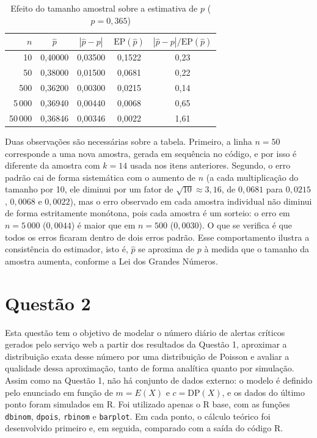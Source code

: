 \documentclass[10pt,a4paper]{article}
\begin{document}
\begin{table}[H]
\centering
\caption{Efeito do tamanho amostral sobre a estimativa de $p$ ($p = 0{,}365$)}
\label{tab:q1-tamanho}
\begin{tabular}{rcccc}
\hline
$n$ & $\hat{p}$ & $|\hat{p} - p|$ & $\text{EP}(\hat{p})$ & $|\hat{p} - p|/\text{EP}(\hat{p})$ \\
\hline
10     & 0,40000 & 0,03500 & 0,1522 & 0,23 \\
50     & 0,38000 & 0,01500 & 0,0681 & 0,22 \\
500    & 0,36200 & 0,00300 & 0,0215 & 0,14 \\
5\,000  & 0,36940 & 0,00440 & 0,0068 & 0,65 \\
50\,000 & 0,36846 & 0,00346 & 0,0022 & 1,61 \\
\hline
\end{tabular}
\end{table}

Duas observações são necessárias sobre a tabela. Primeiro, a linha $n = 50$ corresponde a uma nova amostra, gerada em sequência no código, e por isso é diferente da amostra com $k = 14$ usada nos itens anteriores. Segundo, o erro padrão cai de forma sistemática com o aumento de $n$ (a cada multiplicação do tamanho por 10, ele diminui por um fator de $\sqrt{10} \approx 3{,}16$, de $0{,}0681$ para $0{,}0215$, $0{,}0068$ e $0{,}0022$), mas o erro observado em cada amostra individual não diminui de forma estritamente monótona, pois cada amostra é um sorteio: o erro em $n = 5\,000$ ($0{,}0044$) é maior que em $n = 500$ ($0{,}0030$). O que se verifica é que todos os erros ficaram dentro de dois erros padrão. Esse comportamento ilustra a consistência do estimador, isto é, $\hat{p}$ se aproxima de $p$ à medida que o tamanho da amostra aumenta, conforme a Lei dos Grandes Números.
\clearpage

\section{Questão 2}

Esta questão tem o objetivo de modelar o número diário de alertas críticos gerados pelo serviço web a partir dos resultados da Questão 1, aproximar a distribuição exata desse número por 
uma distribuição de Poisson e avaliar a qualidade dessa aproximação, tanto de forma analítica quanto por simulação. Assim como na Questão 1, não há conjunto de dados externo: o modelo 
é definido pelo enunciado em função de $m = E(X)$ e $c = \text{DP}(X)$, e os dados do último ponto foram simulados em R. Foi utilizado apenas o R base, com as funções \texttt{dbinom}, 
\texttt{dpois}, \texttt{rbinom} e \texttt{barplot}. Em cada ponto, o cálculo teórico foi desenvolvido primeiro e, em seguida, comparado com a saída do código R.
\end{document}
